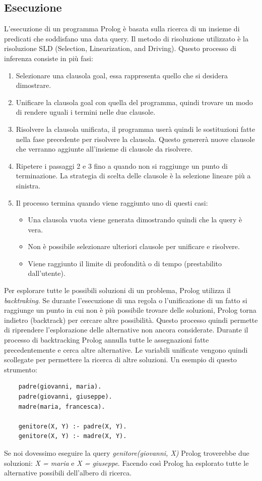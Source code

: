 \subsection{Esecuzione}
\label{subsec:esecuzione}
L'esecuzione di un programma Prolog è basata sulla ricerca di un insieme di predicati che soddisfano una data query. Il metodo di risoluzione utilizzato è la risoluzione SLD \cite{kowalski1974predicate} (Selection, Linearization, and Driving).
Questo processo di inferenza consiste in più fasi:
\begin{enumerate}
    \item Selezionare una clausola goal, essa rappresenta quello che si desidera dimostrare.
    \item Unificare la clausola goal con quella del programma, quindi trovare un modo di rendere uguali i termini nelle due clausole.
    \item Risolvere la clausola unificata, il programma userà quindi le sostituzioni fatte nella fase precedente per risolvere la clausola. Questo genererà nuove clausole che verranno aggiunte all'insieme di clausole da risolvere.
    \item Ripetere i passaggi 2 e 3 fino a quando non si raggiunge un punto di terminazione. La strategia di scelta delle clausole  è la selezione lineare più a sinistra.
    \item Il processo termina quando viene raggiunto uno di questi casi:
          \begin{itemize}
              \item Una clausola vuota viene generata dimostrando quindi che la query è vera.
              \item Non è possibile selezionare ulteriori clausole per unificare e risolvere.
              \item Viene raggiunto il limite di profondità o di tempo (prestabilito dall'utente).
          \end{itemize}
\end{enumerate}
Per esplorare tutte le possibili soluzioni di un problema, Prolog utilizza il \textit{backtraking}. Se durante l'esecuzione di una
regola o l'unificazione di un fatto si raggiunge un punto in cui non è più possibile trovare delle soluzioni, Prolog torna indietro (backtrack)
per cercare altre possibilità. Questo processo quindi permette di riprendere l'esplorazione delle alternative non ancora considerate.
Durante il processo di backtracking Prolog annulla tutte le assegnazioni fatte precedentemente e cerca altre alternative. Le variabili unificate vengono quindi scollegate
per permettere la ricerca di altre soluzioni. Un esempio di questo strumento:
\begin{verbatim}
    padre(giovanni, maria).
    padre(giovanni, giuseppe).
    madre(maria, francesca).

    genitore(X, Y) :- padre(X, Y).
    genitore(X, Y) :- madre(X, Y).
\end{verbatim}
Se noi dovessimo eseguire la query \textit{genitore(giovanni, X)} Prolog troverebbe due soluzioni: \textit{X = maria} e \textit{X = giuseppe}.
Facendo così Prolog ha esplorato tutte le alternative possibili dell'albero di ricerca.
